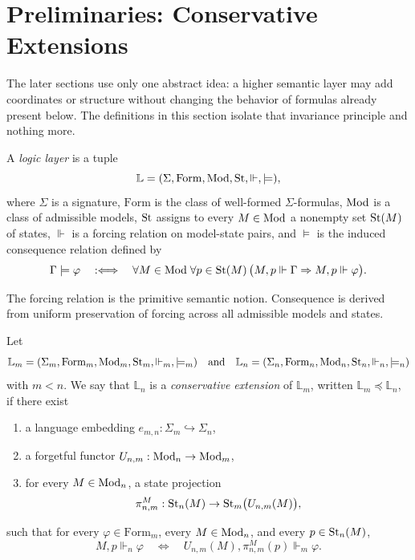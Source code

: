 \section{Preliminaries: Conservative Extensions}\label{sec:preliminaries}

The later sections use only one abstract idea: a higher semantic layer may add coordinates or structure without changing the behavior of formulas already present below. The definitions in this section isolate that invariance principle and nothing more.

\begin{definition}\label{def:logic-layer}
A \emph{logic layer} is a tuple
\[
\mathbb{L}=(\Sigma,\mathrm{Form},\mathrm{Mod},\mathrm{St},\Vdash,\models),
\]
where $\Sigma$ is a signature, $\mathrm{Form}$ is the class of well-formed $\Sigma$-formulas, $\mathrm{Mod}$ is a class of admissible models, $\mathrm{St}$ assigns to every $M\in\mathrm{Mod}$ a nonempty set $\mathrm{St}(M)$ of states, $\Vdash$ is a forcing relation on model-state pairs, and $\models$ is the induced consequence relation defined by
\[
\Gamma\models\varphi
\quad:\Longleftrightarrow\quad
\forall M\in\mathrm{Mod}\;\forall p\in\mathrm{St}(M)\,
\bigl(M,p\Vdash\Gamma \Rightarrow M,p\Vdash\varphi\bigr).
\]
\end{definition}

The forcing relation is the primitive semantic notion. Consequence is derived from uniform preservation of forcing across all admissible models and states.

\begin{definition}\label{def:conservative-extension}
Let
\[
\mathbb{L}_m=(\Sigma_m,\mathrm{Form}_m,\mathrm{Mod}_m,\mathrm{St}_m,\Vdash_m,\models_m)
\quad\text{and}\quad
\mathbb{L}_n=(\Sigma_n,\mathrm{Form}_n,\mathrm{Mod}_n,\mathrm{St}_n,\Vdash_n,\models_n)
\]
with $m<n$. We say that $\mathbb{L}_n$ is a \emph{conservative extension} of $\mathbb{L}_m$, written $\mathbb{L}_m\preceq\mathbb{L}_n$, if there exist
\begin{enumerate}[label=(\roman*),nosep]
\item a language embedding $e_{m,n}:\Sigma_m\hookrightarrow\Sigma_n$,
\item a forgetful functor $U_{n,m}:\mathrm{Mod}_n\to\mathrm{Mod}_m$,
\item for every $M\in\mathrm{Mod}_n$, a state projection
\[
\pi^M_{n,m}:\mathrm{St}_n(M)\to \mathrm{St}_m\bigl(U_{n,m}(M)\bigr),
\]
\end{enumerate}
such that for every $\varphi\in \mathrm{Form}_m$, every $M\in\mathrm{Mod}_n$, and every $p\in\mathrm{St}_n(M)$,
\begin{equation}\label{eq:conservative-extension}
M,p\Vdash_n \varphi
\quad\Longleftrightarrow\quad
U_{n,m}(M),\pi^M_{n,m}(p)\Vdash_m \varphi.
\end{equation}
\end{definition}

